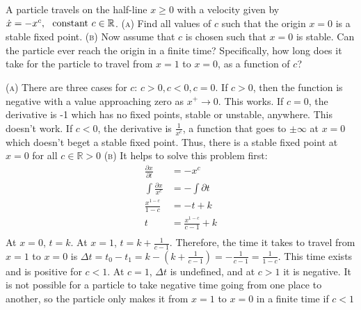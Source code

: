 \documentclass[11pt,answers]{exam}
\begin{document}
\begin{questions}
\item A particle travels on the half-line $x \geq 0$ with a velocity given by $\dot{x} = -x^c, ~ \hbox{ constant } c \in \mathbb{R}$.
\newline\textsc{(a)} Find all values of $c$ such that the origin $x = 0$ is a stable fixed point. 
\newline\textsc{(b)} Now assume that $c$ is chosen such that $x = 0$ is stable. Can the particle ever reach the origin in a
finite time? Specifically, how long does it take for the particle to travel from $x = 1$ to $x = 0$, as a
function of $c$?

\begin{solution}
\newline\textsc{(a)} There are three cases for $c$: $c > 0, c < 0, c = 0$.
\newline If $c > 0$, then the function is negative with a value approaching zero as $x^+ \to 0$.  This works.
\newline If $c = 0$, the derivative is -1 which has no fixed points, stable or unstable, anywhere.  This doesn't work.
\newline If $c < 0$, the derivative is $\frac{1}{x^c}$, a function that goes to $\pm\infty$ at $x=0$ which doesn't beget a stable fixed point.
\newline Thus, there is a stable fixed point at $x=0$ for all $c \in \mathbb{R}> 0$
\newline\newline\textsc{(b)} It helps to solve this problem first:
\begin{align*}
\frac{\partial{x}}{\partial{t}} &= -x^c \\
\int \frac{\partial{x}}{x^c} &= -\int\partial{t} \\
\frac{x^{1-c}}{1-c} &= -t + k \\
t &= \frac{x^{1-c}}{c-1} + k \\
\end{align*}
At $x =0$, $t = k$.  At $x = 1$, $t = k + \frac{1}{c-1}$.  Therefore, the time it takes to travel from $x = 1$ to $x = 0$ is $\Delta t = t_0 - t_1 = k - \left( k + \frac{1}{c-1} \right) = -\frac{1}{c-1} = \frac{1}{1-c}$.  This time exists and is positive for $c < 1$.  At $c = 1$, $\Delta t$ is undefined, and at $c > 1$ it is negative.  It is not possible for a particle to take negative time going from one place to another, so the particle only makes it from $x = 1$ to $x = 0$ in a finite time if $ c < 1$
\end{solution}


\end{questions}
\end{document}
